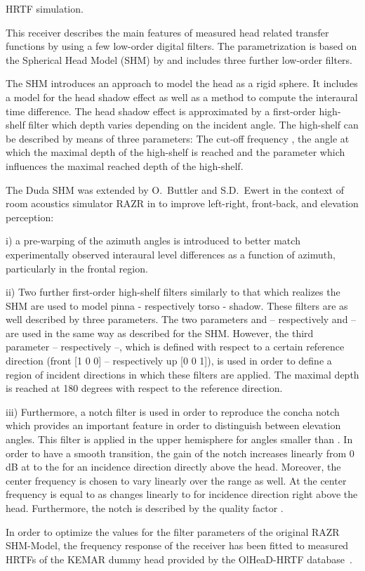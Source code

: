 HRTF simulation.

This receiver describes the main features of measured head related transfer
functions by using a few low-order digital filters. The parametrization is
based on the Spherical Head Model (SHM) by \citet{BrownDuda}
and includes three further low-order filters.

The SHM introduces an approach to model the head as a rigid sphere.
It includes a model for the head shadow effect as well as a method to
compute the interaural time difference.
The head shadow effect is approximated by a first-order high-shelf filter
which depth varies depending on the incident angle. The high-shelf can be
described by means of three parameters: The cut-off frequency ,
the angle  at which the maximal depth of the high-shelf is
reached and the parameter  which influences the maximal
reached depth of the high-shelf.

The Duda SHM was extended by O.\ Buttler and S.D.\ Ewert in the context
of room acoustics simulator RAZR \citep{Wendt2014b,Ewert2018}
in \citet{Buttler2018} to improve left-right, front-back, and
elevation perception:

i) a pre-warping of the azimuth angles is introduced to better match experimentally
observed interaural level differences as a function of azimuth, particularly in
the frontal region.

ii) Two further first-order high-shelf filters similarly to that which
realizes the SHM are used to model pinna
- respectively torso - shadow. These filters are as well described by
three parameters. The two parameters  and
 -- respectively  and
 -- are used in the same way as described for the SHM.
However, the third parameter  -- respectively
 --, which is defined with respect to a certain
reference direction (front [1 0 0] -- respectively up [0 0 1]), is used
in order to define a region of incident directions in which these filters
are applied. The maximal depth is reached at 180 degrees with respect to
the reference direction.

iii) Furthermore, a notch filter is used in order to reproduce the concha notch
which provides an important feature in order to distinguish between elevation
angles. This filter is applied in the upper hemisphere for angles smaller
than . In order to have a smooth transition, the
gain of the notch increases linearly from 0 dB at 
to the  for an incidence direction directly above the head.
Moreover, the center frequency is chosen to vary linearly over the range
as well. At  the center frequency is equal to
 as changes linearly to  for incidence
direction right above the head. Furthermore, the notch is described by the
quality factor .

In order to optimize the values for the filter parameters of the
original RAZR SHM-Model, the frequency response of the receiver has
been fitted to measured HRTFs of the KEMAR dummy
head \citep{Schwark2020} provided by the OlHeaD-HRTF
database~\citep{Denk2020}.


